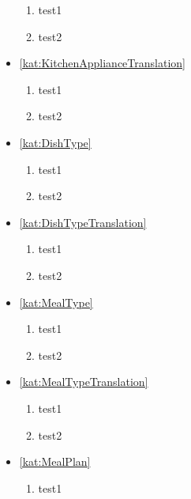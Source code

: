 \begin{itemize}[label={\textbf{Ograniczenia dla}}, wide, labelwidth=!, labelindent=0pt]
    \begin{enumerate}[label={\textbf{OGR/\protect\threedigits{\arabic{enumi}}}}, wide, labelwidth=!, resume]
        \item test1
        \item test2
    \end{enumerate}
    \item\ref{kat:KitchenApplianceTranslation}
    \begin{enumerate}[label={\textbf{OGR/\protect\threedigits{\arabic{enumi}}}}, wide, labelwidth=!, resume]
        \item test1
        \item test2
    \end{enumerate}
    \item\ref{kat:DishType}
    \begin{enumerate}[label={\textbf{OGR/\protect\threedigits{\arabic{enumi}}}}, wide, labelwidth=!, resume]
        \item test1
        \item test2
    \end{enumerate}
    \item\ref{kat:DishTypeTranslation}
    \begin{enumerate}[label={\textbf{OGR/\protect\threedigits{\arabic{enumi}}}}, wide, labelwidth=!, resume]
        \item test1
        \item test2
    \end{enumerate}
    \item\ref{kat:MealType}
    \begin{enumerate}[label={\textbf{OGR/\protect\threedigits{\arabic{enumi}}}}, wide, labelwidth=!, resume]
        \item test1
        \item test2
    \end{enumerate}
    \item\ref{kat:MealTypeTranslation}
    \begin{enumerate}[label={\textbf{OGR/\protect\threedigits{\arabic{enumi}}}}, wide, labelwidth=!, resume]
        \item test1
        \item test2
    \end{enumerate}
    \item\ref{kat:MealPlan}
    \begin{enumerate}[label={\textbf{OGR/\protect\threedigits{\arabic{enumi}}}}, wide, labelwidth=!, resume]
        \item test1

\end{enumerate}
\end{itemize}
